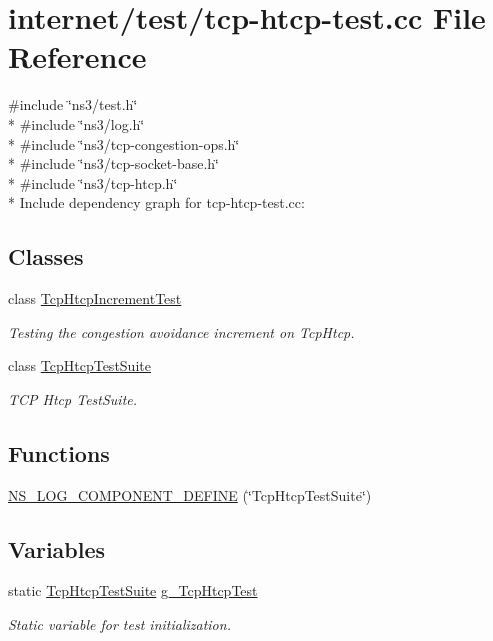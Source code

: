 \hypertarget{tcp-htcp-test_8cc}{}\section{internet/test/tcp-\/htcp-\/test.cc File Reference}
\label{tcp-htcp-test_8cc}
{\ttfamily \#include \char`\"{}ns3/test.\+h\char`\"{}}\\*
{\ttfamily \#include \char`\"{}ns3/log.\+h\char`\"{}}\\*
{\ttfamily \#include \char`\"{}ns3/tcp-\/congestion-\/ops.\+h\char`\"{}}\\*
{\ttfamily \#include \char`\"{}ns3/tcp-\/socket-\/base.\+h\char`\"{}}\\*
{\ttfamily \#include \char`\"{}ns3/tcp-\/htcp.\+h\char`\"{}}\\*
Include dependency graph for tcp-\/htcp-\/test.cc\+:
\subsection*{Classes}
\begin{DoxyCompactItemize}
\item 
class \hyperlink{classTcpHtcpIncrementTest}{Tcp\+Htcp\+Increment\+Test}
\begin{DoxyCompactList}\small\item\em Testing the congestion avoidance increment on Tcp\+Htcp. \end{DoxyCompactList}\item 
class \hyperlink{classTcpHtcpTestSuite}{Tcp\+Htcp\+Test\+Suite}
\begin{DoxyCompactList}\small\item\em T\+CP Htcp Test\+Suite. \end{DoxyCompactList}\end{DoxyCompactItemize}
\subsection*{Functions}
\begin{DoxyCompactItemize}
\item 
\hyperlink{tcp-htcp-test_8cc_a21a198d30212ab87493895d05109948b}{N\+S\+\_\+\+L\+O\+G\+\_\+\+C\+O\+M\+P\+O\+N\+E\+N\+T\+\_\+\+D\+E\+F\+I\+NE} (\char`\"{}Tcp\+Htcp\+Test\+Suite\char`\"{})
\end{DoxyCompactItemize}
\subsection*{Variables}
\begin{DoxyCompactItemize}
\item 
static \hyperlink{classTcpHtcpTestSuite}{Tcp\+Htcp\+Test\+Suite} \hyperlink{tcp-htcp-test_8cc_a933c1d8882678edb1f3c05d278cda0e9}{g\+\_\+\+Tcp\+Htcp\+Test}
\begin{DoxyCompactList}\small\item\em Static variable for test initialization. \end{DoxyCompactList}\end{DoxyCompactItemize}


